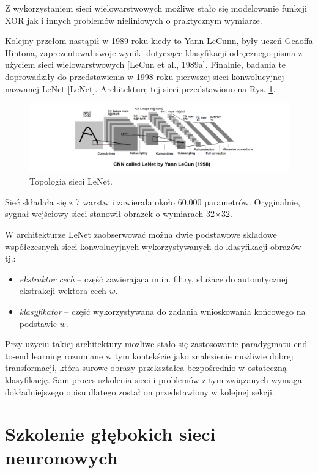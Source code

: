 Z wykorzystaniem sieci wielowarstwowych możliwe stało się modelowanie funkcji XOR jak i innych problemów nieliniowych o praktycznym wymiarze. 

Kolejny przełom nastąpił w 1989 roku kiedy to Yann LeCunn, były uczeń Geaoffa Hintona, zaprezentował swoje wyniki dotyczące klasyfikacji odręcznego pisma z użyciem sieci wielowarstwowych [LeCun et al., 1989a]. Finalnie, badania te doprowadziły do przedstawienia w 1998 roku pierwszej sieci konwolucyjnej nazwanej LeNet [LeNet]. Architekturę tej sieci przedstawiono na Rys. \ref{LeNet}.
\begin{figure}[h!]
	\centering
	\includegraphics[width=1\textwidth]{figures/lenet.png}
	\caption{Topologia sieci LeNet.}
	\label{LeNet}
\end{figure}

Sieć składała się z 7 warstw i zawierała około 60,000 parametrów. Oryginalnie, sygnał wejściowy sieci stanowił obrazek o wymiarach 32$\times$32.

W architekturze LeNet zaobserwować można dwie podstawowe składowe współczesnych sieci konwolucyjnych wykorzystywanych do klasyfikacji obrazów tj.:
\begin{itemize}
	\item \textit{ekstraktor cech} -- część zawierająca m.in. filtry, służace do automtycznej ekstrakcji wektora cech $w$.
	\item \textit{klasyfikator} -- część wykorzystywana do zadania wnioskowania końcowego na podstawie $w$.
\end{itemize}  

Przy użyciu takiej architektury możliwe stało się zastosowanie paradygmatu end-to-end learning rozumiane w tym kontekście jako znalezienie możliwie dobrej transformacji, która surowe obrazy przekształca bezpośrednio w ostateczną klasyfikację. Sam proces szkolenia sieci i problemów z tym związanych wymaga dokładniejszego opisu dlatego został on przedstawiony w kolejnej sekcji.  

\section{Szkolenie głębokich sieci neuronowych}

